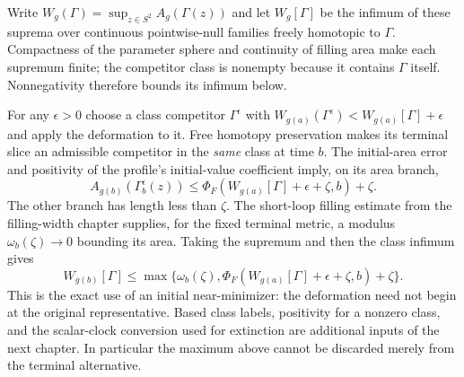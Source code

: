 Write $W_g(\Gamma)=\sup_{z\in S^2}A_g(\Gamma(z))$ and let
$W_g[\Gamma]$ be the infimum of these suprema over continuous pointwise-null
families freely homotopic to $\Gamma$.  Compactness of the parameter sphere
and continuity of filling area make each supremum finite; the competitor
class is nonempty because it contains $\Gamma$ itself.  Nonnegativity
therefore bounds its infimum below.

For any $\epsilon>0$ choose a class competitor $\Gamma^\epsilon$ with
$W_{g(a)}(\Gamma^\epsilon)<W_{g(a)}[\Gamma]+\epsilon$ and apply the
deformation to it.  Free homotopy preservation makes its terminal slice
an admissible competitor in the \emph{same} class at time $b$.
The initial-area error and positivity of the profile's initial-value
coefficient imply, on its area branch,
\[
 A_{g(b)}(\Gamma_b^\epsilon(z))
 \le\Phi_F(W_{g(a)}[\Gamma]+\epsilon+\zeta,b)+\zeta.
\]
The other branch has length less than $\zeta$.  The short-loop filling
estimate from the filling-width chapter supplies, for the fixed terminal
metric, a modulus $\omega_b(\zeta)\to0$ bounding its area.  Taking the
supremum and then the class infimum gives
\[
 W_{g(b)}[\Gamma]\le
 \max\{\omega_b(\zeta),
       \Phi_F(W_{g(a)}[\Gamma]+\epsilon+\zeta,b)+\zeta\}.
\]
This is the exact use of an initial near-minimizer: the deformation need
not begin at the original representative.  Based class labels, positivity
for a nonzero class, and the scalar-clock conversion used for extinction
are additional inputs of the next chapter.  In particular the maximum
above cannot be discarded merely from the terminal alternative.
